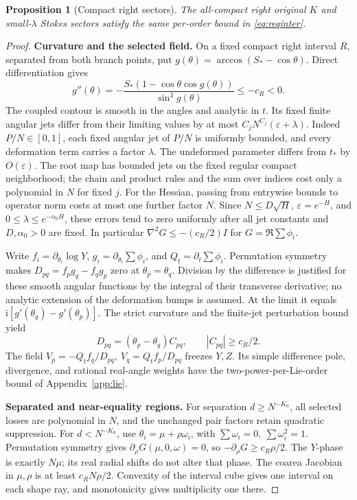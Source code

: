 \documentclass[11pt]{article}
\numberwithin{equation}{section}
\newtheorem{proposition}[theorem]{Proposition}
\theoremstyle{definition}
\newcommand{\ii}{\mathrm i}
\newcommand{\eps}{\varepsilon}
\begin{document}
\begin{proposition}[Compact right sectors]\label{prop:compactR}
The all-compact right original \(K\) and small-\(\lambda\) Stokes
sectors satisfy the same per-order bound in \eqref{eq:reqinter}.
\end{proposition}
\begin{proof}
\noindent\textbf{Curvature and the selected field.} On a fixed compact right interval \(R\), separated from both branch
points, put \(g(\theta)=\arccos(S_*-\cos\theta)\). Direct differentiation
gives
\[
 g''(\theta)=-\frac{S_*(1-\cos\theta\cos g(\theta))}{\sin^3g(\theta)}
            \le-c_R<0 .
\]
The coupled contour is smooth in the angles and analytic in \(t\).
Its fixed finite angular jets differ from their limiting values by at most
\(C_jN^{C_j}(\eps+\lambda)\). Indeed \(P/N\in[0,1]\), each
fixed angular jet of \(P/N\) is uniformly bounded, and every
deformation term carries a factor \(\lambda\). The undeformed
parameter differs from \(t_*\) by \(O(\eps)\). The root map has
bounded jets on the fixed regular compact neighborhood; the chain
and product rules and the sum over indices cost only a polynomial
in \(N\) for fixed \(j\). For the Hessian, passing from entrywise
bounds to operator norm costs at most one further factor \(N\).
Since \(N\le D\sqrt H\), \(\eps=e^{-H}\), and
\(0\le\lambda\le e^{-\alpha_0H}\), these errors tend to zero
uniformly after all jet constants and \(D,\alpha_0>0\) are fixed.
In particular
\(\nabla^2 G\le-(c_R/2)I\) for \(G=\Re\sum\phi_i\).

Write \(f_i=\partial_{\theta_i}\log Y\), \(g_i=\partial_{\theta_i}\sum\phi_i\),
and \(Q_t=\partial_t\sum\phi_i\). Permutation symmetry makes
\(D_{pq}=f_pg_q-f_qg_p\) zero at \(\theta_p=\theta_q\).
Division by the difference is justified for these smooth angular
functions by the integral of their transverse derivative; no analytic
extension of the deformation bumps is assumed.
At the limit it equals \(\ii[g'(\theta_q)-g'(\theta_p)]\).
The strict curvature and the finite-jet perturbation bound yield
\[
 D_{pq}=(\theta_p-\theta_q)C_{pq},\qquad |C_{pq}|\ge c_R/2 .
\]
The field
\(V_p=-Q_tf_q/D_{pq},\ V_q=Q_tf_p/D_{pq}\)
freezes \(Y,Z\). Its simple difference pole, divergence, and
rational real-angle weights have the two-power-per-Lie-order
bound of Appendix~\ref{app:lie}.

\par\smallskip\noindent\textbf{Separated and near-equality regions.} For separation \(d\ge N^{-K_0}\), all selected losses are polynomial
in \(N\), and the unchanged pair factors retain quadratic suppression.
For \(d<N^{-K_0}\), use \(\theta_i=\mu+\rho\omega_i\), with
\(\sum\omega_i=0,\ \sum\omega_i^2=1\).
Permutation symmetry gives \(\partial_\rho G(\mu,0,\omega)=0\),
so \(-\partial_\rho G\ge c_R\rho/2\).
The \(Y\)-phase is exactly \(N\mu\); its real radial shifts do not
alter that phase. The coarea Jacobian in \(\mu,\rho\) is at least
\(c_RN\rho/2\). Convexity of the interval cube gives one interval
on each shape ray, and monotonicity gives multiplicity one there.


\end{proof}
\end{document}
